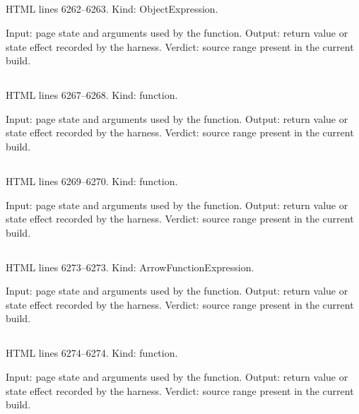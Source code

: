 \subsection*{\texttt{}}
\label{vf_282_CC_DEFAULT_CFG}
HTML lines 6262--6263. Kind: ObjectExpression.

Input: page state and arguments used by the function.
Output: return value or state effect recorded by the harness.
Verdict: source range present in the current build.

\subsection*{\texttt{}}
\label{vf_283_ccCfg}
HTML lines 6267--6268. Kind: function.

Input: page state and arguments used by the function.
Output: return value or state effect recorded by the harness.
Verdict: source range present in the current build.

\subsection*{\texttt{}}
\label{vf_284_ccSetCfg}
HTML lines 6269--6270. Kind: function.

Input: page state and arguments used by the function.
Output: return value or state effect recorded by the harness.
Verdict: source range present in the current build.

\subsection*{\texttt{}}
\label{vf_285_CC_C4}
HTML lines 6273--6273. Kind: ArrowFunctionExpression.

Input: page state and arguments used by the function.
Output: return value or state effect recorded by the harness.
Verdict: source range present in the current build.

\subsection*{\texttt{}}
\label{vf_286_ccPhase}
HTML lines 6274--6274. Kind: function.

Input: page state and arguments used by the function.
Output: return value or state effect recorded by the harness.
Verdict: source range present in the current build.

